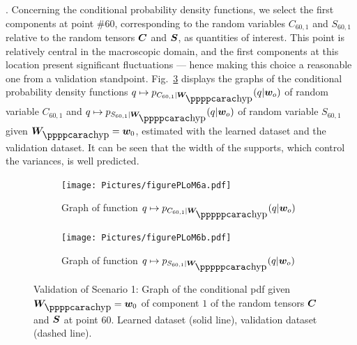 .
%
Concerning the conditional probability density functions, we select the first components at point $\# 60$, corresponding to the random variables $C_{60,1}$ and $S_{60,1}$ relative to the random tensors ${\boldsymbol{C}}$ and ${\boldsymbol{S}}$, as quantities of interest. This point is relatively central in the macroscopic domain, and the first components at this location present significant fluctuations --- hence making this choice a reasonable one from a validation standpoint.
%
Fig.~\ref{fig:figurePLoM6} displays the graphs of the conditional probability density functions $q\mapsto p_{ C_{60,1} \vert \bfW_\hypp } (q \vert \bfw_o)$ of random variable $C_{60,1}$ and $q\mapsto p_{ S_{60,1} \vert \bfW_\hypp} (q \vert \bfw_o)$ of random variable $S_{60,1}$ given $\bfW_\hypp =\bfw_0$, estimated with the learned dataset and the validation dataset. It can be seen that the width of the supports, which control the variances, is well predicted. 
\begin{figure}[!htb]
    \centering
    \begin{subfigure}[b]{0.45\textwidth}
    \centering
        \texttt{[image: Pictures/figurePLoM6a.pdf]}
        \caption{Graph of function $q\mapsto p_{ C_{60,1} \vert \bfW_\hyppp } (q \vert \bfw_o)$}
        \label{fig:figurePLoM6a}
    \end{subfigure}
    \centering
    \begin{subfigure}[b]{0.45\textwidth}
    \centering
        \texttt{[image: Pictures/figurePLoM6b.pdf]}
        \caption{Graph of function $q\mapsto p_{ S_{60,1} \vert \bfW_\hyppp } (q \vert \bfw_o)$}
        \label{fig:figurePLoM6b}
    \end{subfigure}
    \caption{Validation of Scenario 1: Graph of the conditional pdf given $\bfW_\hypp =\bfw_0$ of component $1$ of the random tensors ${\boldsymbol{C}}$ and ${\boldsymbol{S}}$ at point $60$. Learned dataset (solid line), validation dataset (dashed line).}
    \label{fig:figurePLoM6}
\end{figure}

